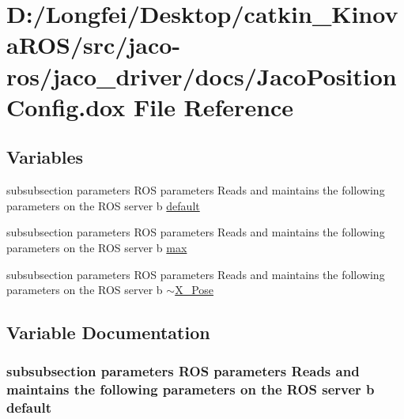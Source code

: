 \hypertarget{JacoPositionConfig_8dox}{}\section{D\+:/\+Longfei/\+Desktop/catkin\+\_\+\+Kinova\+R\+O\+S/src/jaco-\/ros/jaco\+\_\+driver/docs/\+Jaco\+Position\+Config.dox File Reference}
\label{JacoPositionConfig_8dox}
\subsection*{Variables}
\begin{DoxyCompactItemize}
\item 
subsubsection parameters R\+OS parameters Reads and maintains the following parameters on the R\+OS server b \hyperlink{JacoPositionConfig_8dox_a94d02332ecf13e7845f06fe8c343e101}{default}
\item 
subsubsection parameters R\+OS parameters Reads and maintains the following parameters on the R\+OS server b \hyperlink{JacoPositionConfig_8dox_a55c9de72d9f3630abdf51bfe39c191dd}{max}
\item 
subsubsection parameters R\+OS parameters Reads and maintains the following parameters on the R\+OS server b \hyperlink{JacoPositionConfig_8dox_a9fff660751927d01485c1718209052c8}{$\sim$\+X\+\_\+\+Pose}
\end{DoxyCompactItemize}


\subsection{Variable Documentation}
\subsubsection[{\texorpdfstring{default}{default}}]{\setlength{\rightskip}{0pt plus 5cm}subsubsection parameters R\+OS parameters Reads and maintains the following parameters on the R\+OS server b default}\hypertarget{JacoPositionConfig_8dox_a94d02332ecf13e7845f06fe8c343e101}{}\label{JacoPositionConfig_8dox_a94d02332ecf13e7845f06fe8c343e101}

